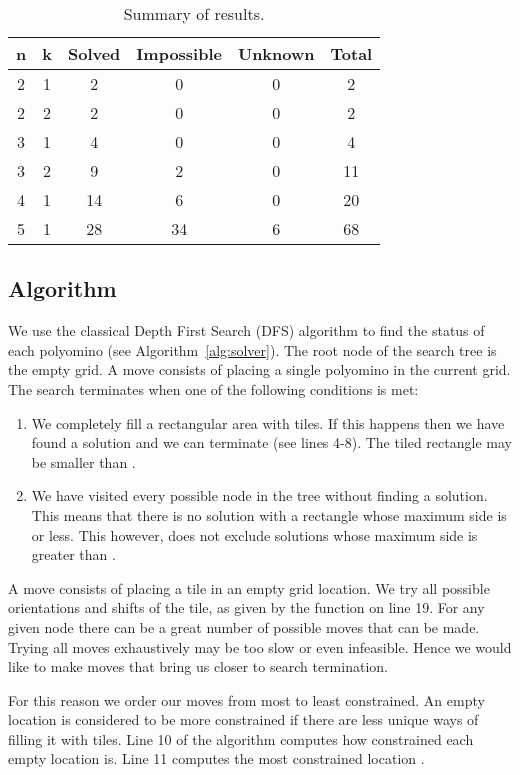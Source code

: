 \documentclass[10pt,a4paper]{article}
\theoremstyle{definition}
\begin{document}
\begin{table}[!htpb]
\centering
\begin{tabular}{|c|c|c|c|c|c|}
\hline
n & k & Solved & Impossible & Unknown & Total \\ \hline
2 & 1 & 2 & 0 & 0 & 2 \\ \hline
2 & 2 & 2 & 0 & 0 & 2 \\ \hline
3 & 1 & 4 & 0 & 0 & 4 \\ \hline
3 & 2 & 9 & 2 & 0 & 11 \\ \hline
4 & 1 & 14 & 6 & 0 & 20 \\ \hline
5 & 1 & 28 & 34 & 6 & 68 \\ \hline
\end{tabular}
\caption{Summary of results.}
\label{tab:summary}
\end{table}


\subsection{Algorithm}

We use the classical Depth First Search (DFS) algorithm to find the status of each polyomino (see Algorithm~\ref{alg:solver}).
The root node of the search tree is the empty  grid. A move consists of placing a single polyomino in the current
grid. The search terminates when one of the following conditions is met:
\begin{enumerate}
\item We completely fill a rectangular area with tiles. 
If this happens then we have found a solution and we can terminate (see lines 4-8).
The tiled rectangle may be smaller than .
\item We have visited every possible node in the tree without finding a solution.
This means that there is no solution with a rectangle
whose maximum side is  or less. This however, does not exclude solutions whose maximum side is greater than .
\end{enumerate}

A move consists of placing a tile in an empty grid location. We try all possible orientations and shifts
of the tile, as given by the  function on line 19.
For any given node there can be a great number of possible moves that can be made. 
Trying all moves exhaustively may be too slow or even infeasible.
Hence we would like to make moves that bring us closer to search termination. 

For this reason we order our moves from most to least constrained. An empty location is considered to be more constrained if there are
less unique ways of filling it with tiles. Line 10 of the algorithm computes how constrained each empty location is. 
Line 11 computes the most constrained location .
\end{document}
